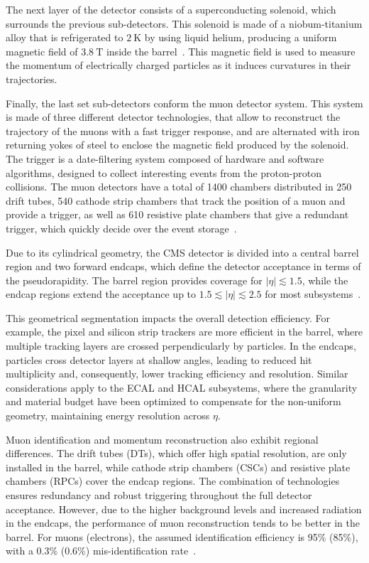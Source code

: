 The next layer of the detector consists of a superconducting solenoid, which surrounds the previous sub-detectors. This solenoid is made of a niobum-titanium alloy that is refrigerated to $2 \mathrm{~K}$ by using liquid helium, producing a uniform magnetic field of $3.8 \mathrm{~T}$ inside the barrel~\parencite{Collaboration_2008}. This magnetic field is used to measure the momentum of electrically charged particles as it induces curvatures in their trajectories.

Finally, the last set sub-detectors conform the muon detector system. This system is made of three different detector technologies, that allow to reconstruct the trajectory of the muons with a fast trigger response, and are alternated with iron returning yokes of steel to enclose the magnetic field produced by the solenoid. The trigger is a date-filtering system composed of hardware and software algorithms, designed to collect interesting events from the proton-proton collisions. The muon detectors have a total of 1400 chambers distributed in 250 drift tubes, 540 cathode strip chambers that track the position of a muon and provide a trigger, as well as 610 resistive plate chambers that give a redundant trigger, which quickly decide over the event storage~\parencite{Collaboration_2008}.


Due to its cylindrical geometry, the CMS detector is divided into a central barrel region and two forward endcaps, which define the detector acceptance in terms of the pseudorapidity. The barrel region provides coverage for $|\eta| \lesssim 1.5$, while the endcap regions extend the acceptance up to $1.5\lesssim|\eta| \lesssim 2.5$ for most subsystems~\parencite{Collaboration_2008}. 

This geometrical segmentation impacts the overall detection efficiency. For example, the pixel and silicon strip trackers are more efficient in the barrel, where multiple tracking layers are crossed perpendicularly by particles. In the endcaps, particles cross detector layers at shallow angles, leading to reduced hit multiplicity and, consequently, lower tracking efficiency and resolution. Similar considerations apply to the ECAL and HCAL subsystems, where the granularity and material budget have been optimized to compensate for the non-uniform geometry, maintaining energy resolution across $\eta$.

Muon identification and momentum reconstruction also exhibit regional differences. The drift tubes (DTs), which offer high spatial resolution, are only installed in the barrel, while cathode strip chambers (CSCs) and resistive plate chambers (RPCs) cover the endcap regions. The combination of technologies ensures redundancy and robust triggering throughout the full detector acceptance. However, due to the higher background levels and increased radiation in the endcaps, the performance of muon reconstruction tends to be better in the barrel. For muons (electrons), the assumed identification efficiency is 95\% (85\%), with a 0.3\% (0.6\%) mis-identification rate~\parencite{CMS-PAS-FTR-13-014,CMS_MUON_17001,CMS_EGM_17001}.

